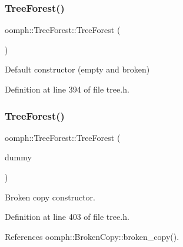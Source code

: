 \subsubsection{\texorpdfstring{Tree\+Forest()}{TreeForest()}\hspace{0.1cm}{\footnotesize\ttfamily [2/3]}}
{\footnotesize\ttfamily oomph\+::\+Tree\+Forest\+::\+Tree\+Forest (\begin{DoxyParamCaption}{ }\end{DoxyParamCaption})\hspace{0.3cm}{\ttfamily [inline]}}



Default constructor (empty and broken) 



Definition at line 394 of file tree.\+h.

\mbox{\label{classoomph_1_1TreeForest_ae53f48ad56b12c57231d8968e5c6ddcc}} 
\subsubsection{\texorpdfstring{Tree\+Forest()}{TreeForest()}\hspace{0.1cm}{\footnotesize\ttfamily [3/3]}}
{\footnotesize\ttfamily oomph\+::\+Tree\+Forest\+::\+Tree\+Forest (\begin{DoxyParamCaption}\item[{const \hyperlink{classoomph_1_1TreeForest}{Tree\+Forest} \&}]{dummy }\end{DoxyParamCaption})\hspace{0.3cm}{\ttfamily [inline]}}



Broken copy constructor. 



Definition at line 403 of file tree.\+h.



References oomph\+::\+Broken\+Copy\+::broken\+\_\+copy().

\mbox{\label{classoomph_1_1TreeForest_abc55e7734f5e2de2c6943084008b5248}} 
